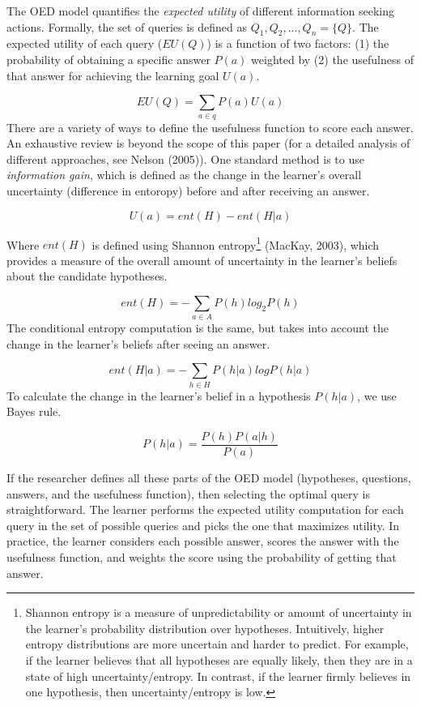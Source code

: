 \documentclass[oneside]{report}
\begin{document}
The OED model quantifies the \emph{expected utility} of different
information seeking actions. Formally, the set of queries is defined as
\(Q_1, Q_2,..., Q_n = \{Q\}\). The expected utility of each query
(\(EU(Q)\)) is a function of two factors: (1) the probability of
obtaining a specific answer \(P(a)\) weighted by (2) the usefulness of
that answer for achieving the learning goal \(U(a)\).

\[EU(Q) = \sum_{a\in q}{P(a)U(a)}\] \noindent There are a variety of
ways to define the usefulness function to score each answer. An
exhaustive review is beyond the scope of this paper (for a detailed
analysis of different approaches, see Nelson (2005)). One standard
method is to use \emph{information gain}, which is defined as the change
in the learner's overall uncertainty (difference in entoropy) before and
after receiving an answer.

\[U(a) = ent(H) - ent(H|a)\]

\noindent Where \(ent(H)\) is defined using Shannon entropy\footnote{Shannon
  entropy is a measure of unpredictability or amount of uncertainty in
  the learner's probability distribution over hypotheses. Intuitively,
  higher entropy distributions are more uncertain and harder to predict.
  For example, if the learner believes that all hypotheses are equally
  likely, then they are in a state of high uncertainty/entropy. In
  contrast, if the learner firmly believes in one hypothesis, then
  uncertainty/entropy is low.} (MacKay, 2003), which provides a measure
of the overall amount of uncertainty in the learner's beliefs about the
candidate hypotheses.

\[ent(H) = -\sum_{a\in A}{P(h)log_2P(h)}\] \noindent The conditional
entropy computation is the same, but takes into account the change in
the learner's beliefs after seeing an answer.

\[ ent(H|a) = -\sum_{h\in H}{P(h|a)logP(h|a)} \] \noindent To calculate
the change in the learner's belief in a hypothesis \(P(h|a)\), we use
Bayes rule.

\[ P(h|a) = \frac{P(h)P(a|h)}{P(a)} \]

\noindent If the researcher defines all these parts of the OED model
(hypotheses, questions, answers, and the usefulness function), then
selecting the optimal query is straightforward. The learner performs the
expected utility computation for each query in the set of possible
queries and picks the one that maximizes utility. In practice, the
learner considers each possible answer, scores the answer with the
usefulness function, and weights the score using the probability of
getting that answer.
\end{document}
